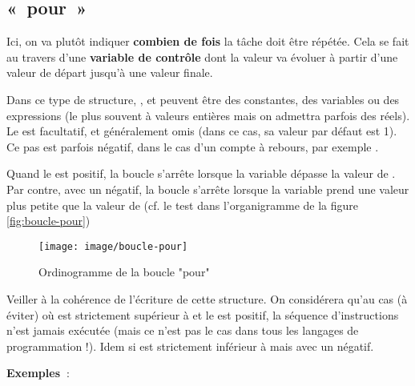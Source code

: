 	\subsection{«~pour~»}

		Ici, on va plutôt indiquer \textbf{combien de fois} la tâche doit être
		répétée. Cela se fait au travers d'une
		\textbf{variable de contrôle} dont la valeur va évoluer à partir
		d'une valeur de départ jusqu'à une
		valeur finale.
		

		Dans ce type de structure, ,  et 
		peuvent être des constantes, des variables ou des expressions (le plus
		souvent à valeurs entières mais on admettra parfois des réels). Le
		 est facultatif, et généralement omis (dans ce cas, sa valeur 
		par défaut est 1). Ce pas est parfois négatif, dans le cas
		d'un compte à rebours, par exemple
		.

		Quand le  est positif, la boucle s'arrête
		lorsque la variable dépasse la valeur de . Par contre, avec
		un  négatif, la boucle s'arrête lorsque la
		variable prend une valeur plus petite que la valeur de 
		(cf. le test dans l'organigramme de la figure \vref{fig:boucle-pour})

		\begin{figure}[h]
		\centering
		\texttt{[image: image/boucle-pour]}
		\caption{Ordinogramme de la boucle "pour"}
		\label{fig:boucle-pour}
		\end{figure}

		Veiller à la cohérence de l’écriture de cette structure. On considérera
		qu’au cas (à éviter) où  est strictement supérieur à
		 et le  est positif, la séquence d’instructions
		n’est jamais exécutée (mais ce n’est pas le cas dans tous les langages
		de programmation !). Idem si  est strictement inférieur à
		 mais avec un  négatif.

		\textbf{Exemples~}:

		
